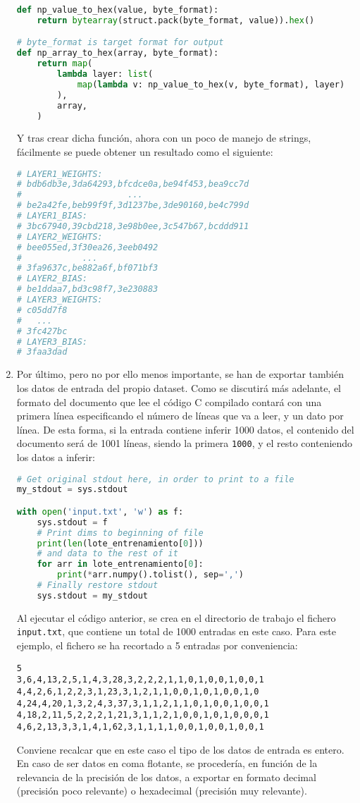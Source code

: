 \begin{enumerate}
\begin{lstlisting}[language=Python]
def np_value_to_hex(value, byte_format):
    return bytearray(struct.pack(byte_format, value)).hex()

# byte_format is target format for output
def np_array_to_hex(array, byte_format):
    return map(
        lambda layer: list(
            map(lambda v: np_value_to_hex(v, byte_format), layer)
        ),
        array,
    )
\end{lstlisting}
    Y tras crear dicha función, ahora con un poco de manejo de strings, fácilmente se puede obtener un resultado como el siguiente:\medskip
\begin{lstlisting}[language=Python]
# LAYER1_WEIGHTS:
# bdb6db3e,3da64293,bfcdce0a,be94f453,bea9cc7d
#                     ...
# be2a42fe,beb99f9f,3d1237be,3de90160,be4c799d
# LAYER1_BIAS:
# 3bc67940,39cbd218,3e98b0ee,3c547b67,bcddd911
# LAYER2_WEIGHTS:
# bee055ed,3f30ea26,3eeb0492
#            ...
# 3fa9637c,be882a6f,bf071bf3
# LAYER2_BIAS:
# be1ddaa7,bd3c98f7,3e230883
# LAYER3_WEIGHTS:
# c05dd7f8
#   ...
# 3fc427bc
# LAYER3_BIAS:
# 3faa3dad
\end{lstlisting}

    \item Por último, pero no por ello menos importante, se han de exportar también los datos de entrada del propio dataset. Como se discutirá más adelante, el formato del documento que lee el código C compilado contará con una primera línea especificando el número de líneas que va a leer, y un dato por línea. De esta forma, si la entrada contiene inferir 1000 datos, el contenido del documento será de 1001 líneas, siendo la primera \texttt{1000}, y el resto conteniendo los datos a inferir:\medskip
\begin{lstlisting}[language=Python]
# Get original stdout here, in order to print to a file
my_stdout = sys.stdout

with open('input.txt', 'w') as f:
    sys.stdout = f
    # Print dims to beginning of file
    print(len(lote_entrenamiento[0]))
    # and data to the rest of it
    for arr in lote_entrenamiento[0]:
        print(*arr.numpy().tolist(), sep=',')
    # Finally restore stdout
    sys.stdout = my_stdout
\end{lstlisting}
    Al ejecutar el código anterior, se crea en el directorio de trabajo el fichero \texttt{input.txt}, que contiene un total de 1000 entradas en este caso. Para este ejemplo, el fichero se ha recortado a 5 entradas por conveniencia:\medskip
\begin{lstlisting}
5
3,6,4,13,2,5,1,4,3,28,3,2,2,2,1,1,0,1,0,0,1,0,0,1
4,4,2,6,1,2,2,3,1,23,3,1,2,1,1,0,0,1,0,1,0,0,1,0
4,24,4,20,1,3,2,4,3,37,3,1,1,2,1,1,0,1,0,0,1,0,0,1
4,18,2,11,5,2,2,2,1,21,3,1,1,2,1,0,0,1,0,1,0,0,0,1
4,6,2,13,3,3,1,4,1,62,3,1,1,1,1,0,0,1,0,0,1,0,0,1
\end{lstlisting}

    Conviene recalcar que en este caso el tipo de los datos de entrada es entero. En caso de ser datos en coma flotante, se procedería, en función de la relevancia de la precisión de los datos, a exportar en formato decimal (precisión poco relevante) o hexadecimal (precisión muy relevante).
\end{enumerate}

